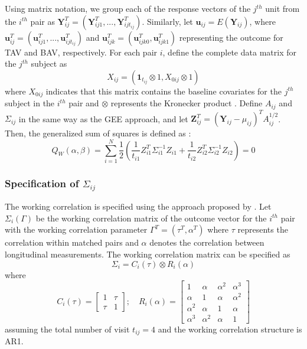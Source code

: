 \documentclass[
]{aft}
\begin{document}
Using matrix notation, we group each of the response vectors of the
\(j^{th}\) unit from the \(i^{th}\) pair as
\(\boldsymbol{Y}^T_{ij} = (\boldsymbol{Y}^T_{ij1}, ..., \boldsymbol{Y}^T_{ijt_{ij}})\).
Similarly, let \(\boldsymbol{u}_{ij} = E(\boldsymbol{Y}_{ij})\), where
\(\boldsymbol{u}^T_{ij} = (\boldsymbol{u}^T_{ij1}, ..., \boldsymbol{u}^T_{ijt_{ij}})\)
and
\(\boldsymbol{u}^T_{ijk} = (\boldsymbol{u}^T_{ijk0}, \boldsymbol{u}^T_{ijk1})\)
representing the outcome for TAV and BAV, respectively. For each pair
\(i\), define the complete data matrix for the \(j^{th}\) subject as \[
X_{ij} = (\boldsymbol{1}_{t_{ij}} \otimes 1, X_{0ij} \otimes 1)
\] where \(X_{0ij}\) indicates that this matrix contains the baseline
covariates for the \(j^{th}\) subject in the \(i^{th}\) pair and
\(\otimes\) represents the Kronecker product \citep{parson2006}. Define
\(A_{ij}\) and \(\Sigma_{ij}\) in the same way as the GEE approach, and
let
\(\boldsymbol{Z}_{ij}^T = (\boldsymbol{Y}_{ij} - \mu_{ij})^T A_{ij}^{1/2}\).
Then, the generalized sum of squares is defined as \citep{Mitani2019}:
\begin{equation}
Q_W(\alpha, \beta) = \sum_{i=1}^N\frac{1}{2}\left(\frac{1}{t_{i1}}Z^T_{i1}\Sigma_{i1}^{-1} Z_{i1} + \frac{1}{t_{i2}}Z^T_{i2}\Sigma_{i2}^{-1} Z_{i2}\right) = 0 \label{eq:qlsGSS}
\end{equation}

\subsubsection{\texorpdfstring{Specification of
\(\Sigma_{ij}\)}{Specification of \textbackslash Sigma\_\{ij\}}}\label{specification-of-sigma_ij}

The working correlation is specified using the approach proposed by
\citet{parson2006}. Let \(\Sigma_i(\Gamma)\) be the working correlation
matrix of the outcome vector for the \(i^{th}\) pair with the working
correlation parameter \(\Gamma^T = (\tau^T, \alpha^T)\) where \(\tau\)
represents the correlation within matched pairs and \(\alpha\) denotes
the correlation between longitudinal measurements. The working
correlation matrix can be specified as \begin{equation}
\Sigma_i = C_i(\tau) \otimes R_i(\alpha) \label{eq:qlsCovMat}
\end{equation} where \[
C_i(\tau) = 
\begin{bmatrix}
1 & \tau \\
\tau & 1
\end{bmatrix}; 
\quad 
R_i(\alpha) = 
\begin{bmatrix}
1 & \alpha & \alpha^2 & \alpha^3\\
\alpha & 1 & \alpha & \alpha^2\\
\alpha^2 & \alpha & 1 & \alpha\\
\alpha^3 & \alpha^2 & \alpha & 1
\end{bmatrix}
\] assuming the total number of visit \(t_{ij} = 4\) and the working
correlation structure is AR1.
\end{document}
